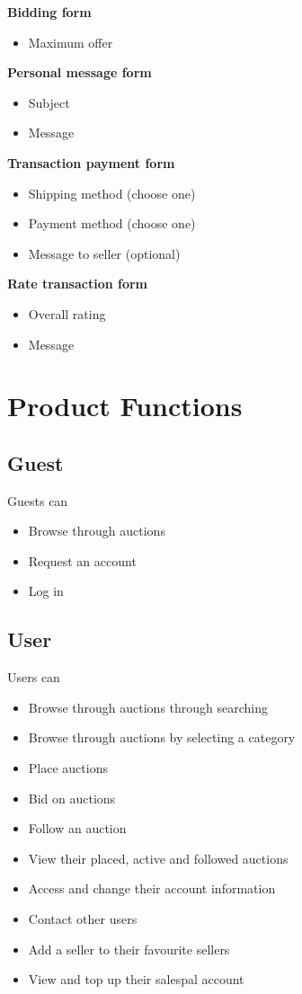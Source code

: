 	\textbf{Bidding form}
		\begin{itemize}
			\item Maximum offer
		\end{itemize}
	\textbf{Personal message form}
		\begin{itemize}
			\item Subject
			\item Message 
		\end{itemize}
	\textbf{Transaction payment form}
		\begin{itemize}
			\item Shipping method (choose one)
			\item Payment method (choose one)
			\item Message to seller (optional) 
		\end{itemize}
	\textbf{Rate transaction form}
		\begin{itemize}
			\item Overall rating
			\item Message 
		\end{itemize}
		
\section{Product Functions}
	\subsection{Guest}
		Guests can
		\begin{itemize}
			\item Browse through auctions
			\item Request an account
			\item Log in
		\end{itemize}
	\subsection{User}
		Users can
		\begin{itemize}
			\item Browse through auctions through searching
			\item Browse through auctions by selecting a category
			\item Place auctions
			\item Bid on auctions
			\item Follow an auction
			\item View their placed, active and followed auctions
			\item Access and change their account information
			\item Contact other users
			\item Add a seller to their favourite sellers
			\item View and top up their salespal account
		\end{itemize}
